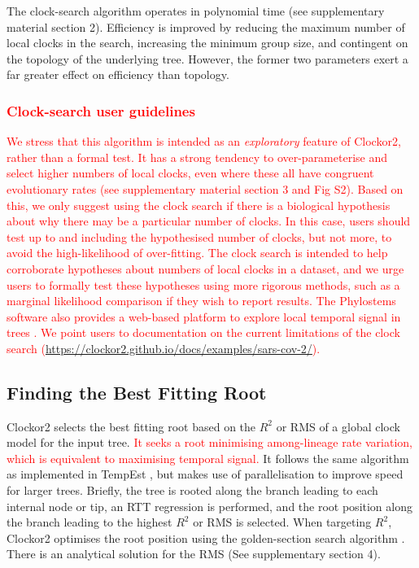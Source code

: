 \documentclass{article}
\begin{document}
The clock-search algorithm operates in polynomial time (see supplementary material section 2). Efficiency is improved by reducing the maximum number of local clocks in the search, increasing the minimum group size, and contingent on the topology of the underlying tree. However, the former two parameters exert a far greater effect on efficiency than topology.

\textcolor{red}{
\subsubsection*{Clock-search user guidelines}
We stress that this algorithm is intended as an \emph{exploratory} feature of Clockor2, rather than a formal test. It has a strong tendency to over-parameterise and select higher numbers of local clocks, even where these all have congruent evolutionary rates (see supplementary material section 3 and Fig S2). Based on this, we only suggest using the clock search if there is a biological hypothesis about why there may be a particular number of clocks. In this case, users should test up to and including the hypothesised number of clocks, but not more, to avoid the high-likelihood of over-fitting. The clock search is intended to help corroborate hypotheses about numbers of local clocks in a dataset, and we urge users to formally test these hypotheses using more rigorous methods, such as a marginal likelihood comparison if they wish to report results. The Phylostems software also provides a web-based platform to explore local temporal signal in trees \citep{doizy_2023_phylostems}. We point users to documentation on the current limitations of the clock search (\url{https://clockor2.github.io/docs/examples/sars-cov-2/}).}

\subsection*{Finding the Best Fitting Root}
Clockor2 selects the best fitting root based on the $R^2$ or RMS of a global clock model for the input tree. \textcolor{red}{It seeks a root minimising among-lineage rate variation, which is equivalent to maximising temporal signal.} It follows the same algorithm as implemented in TempEst \citep{rambaut_exploring_2016}, but makes use of parallelisation to improve speed for larger trees. Briefly, the tree is rooted along the branch leading to each internal node or tip, an RTT regression is performed, and the root position along the branch leading to the highest $R^2$ or RMS is selected. When targeting $R^2$, Clockor2 optimises the root position using the golden-section search algorithm \citep{kiefer_sequential}. There is an analytical solution for the RMS (See supplementary section 4).
\end{document}
